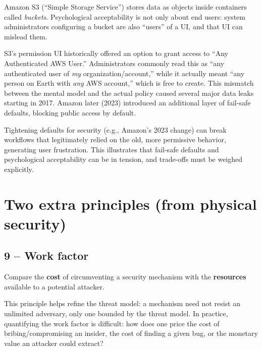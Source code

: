 \begin{example}
Amazon S3 (``Simple Storage Service'') stores data as objects inside containers called \emph{buckets}. Psychological acceptability is not only about end users: system administrators configuring a bucket are also ``users'' of a UI, and that UI can mislead them.

S3's permission UI historically offered an option to grant access to ``Any Authenticated AWS User.'' Administrators commonly read this as ``any authenticated user of \emph{my} organization/account,'' while it actually meant ``any person on Earth with \emph{any} AWS account,'' which is free to create. This mismatch between the mental model and the actual policy caused several major data leaks starting in 2017. Amazon later (2023) introduced an additional layer of fail-safe defaults, blocking public access by default.
\end{example}

\begin{remark}
Tightening defaults for security (e.g., Amazon's 2023 change) can break workflows that legitimately relied on the old, more permissive behavior, generating user frustration. This illustrates that fail-safe defaults and psychological acceptability can be in tension, and trade-offs must be weighed explicitly.
\end{remark}

\section{Two extra principles (from physical security)}

\subsection{9 -- Work factor}

\begin{definition}
Compare the \textbf{cost} of circumventing a security mechanism with the \textbf{resources} available to a potential attacker.
\end{definition}

This principle helps refine the threat model: a mechanism need not resist an unlimited adversary, only one bounded by the threat model. In practice, quantifying the work factor is difficult: how does one price the cost of bribing/compromising an insider, the cost of finding a given bug, or the monetary value an attacker could extract?

